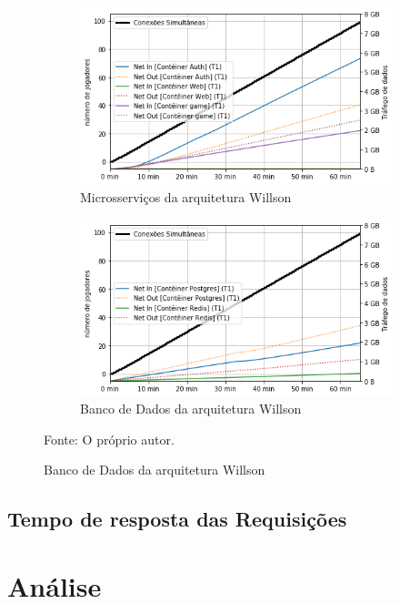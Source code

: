 \begin{figure}[htb!]
        \begin{subfigure}{.5\textwidth}
        \centering
        \includegraphics[width=.95\linewidth]{figuras/testes/w_net_game.png}
        \caption{Microsserviços da arquitetura Willson}
        \label{fig:w_net_game}
    \end{subfigure}%
    \begin{subfigure}{.5\textwidth}
        \centering
        \includegraphics[width=.95\linewidth]{figuras/testes/w_net_db.png}
        \caption{Banco de Dados da arquitetura Willson}
        \label{fig:w_net_db}
    \end{subfigure}%

    Fonte: O próprio autor.
\end{figure}

\subsection{Tempo de resposta das Requisições}

\section{Análise}

